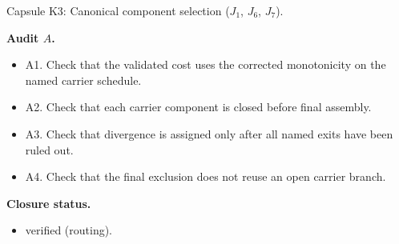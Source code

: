 \documentclass[11pt]{amsart}
\newcommand{\capsulefield}[1]{\par\smallskip\noindent\textbf{#1.}\ }
\begin{document}
\begin{proofcapsule}{Capsule K3: Canonical component selection ($J_1$, $J_6$, $J_7$).}
  \capsulefield{Audit \(A\)}
  \begin{itemize}[leftmargin=1.8em]
  \item A1. Check that the validated cost uses the corrected monotonicity on the named carrier schedule.
  \item A2. Check that each carrier component is closed before final assembly.
  \item A3. Check that divergence is assigned only after all named exits have been ruled out.
  \item A4. Check that the final exclusion does not reuse an open carrier branch.
  \end{itemize}
  \capsulefield{Closure status}
  \begin{itemize}[leftmargin=1.8em]
  \item verified (routing).
  \end{itemize}
\end{proofcapsule}
\end{document}
